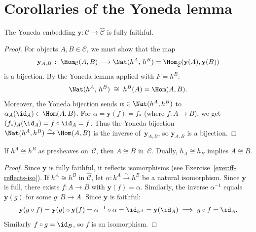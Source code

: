 \section{Corollaries of the Yoneda lemma}\label{sec:yoneda-corollaries}

\begin{corollary}%
\label{cor:yoneda-ff}
The Yoneda embedding $\mathbf{y}\colon\mathcal{C}\to\widehat{\mathcal{C}}$
is fully faithful.
\end{corollary}

\begin{proof}
For objects $A,B\in\mathcal{C}$, we must show that the map
\[
    \mathbf{y}_{A,B} \;\colon\;
    \Hom_{\mathcal{C}}(A,B) \longrightarrow
    \Nat(h^A,\,h^B) = \Hom_{\widehat{\mathcal{C}}}(\mathbf{y}(A),\mathbf{y}(B))
\]
is a bijection.  By the Yoneda lemma applied with $F = h^B$:
\[
    \Nat(h^A,\,h^B) \;\cong\; h^B(A) = \Hom(A,B).
\]
Moreover, the Yoneda bijection sends $\alpha\in\Nat(h^A,h^B)$ to
$\alpha_A(\id_A)\in\Hom(A,B)$.  For $\alpha = \mathbf{y}(f) = f_*$
(where $f\colon A\to B$), we get $(f_*)_A(\id_A) = f\circ\id_A = f$.
Thus the Yoneda bijection $\Nat(h^A,h^B)\xrightarrow{\sim}\Hom(A,B)$
is the inverse of~$\mathbf{y}_{A,B}$, so $\mathbf{y}_{A,B}$ is
a bijection.
\end{proof}

\begin{corollary}%
\label{cor:representable-iso}
If $h^A \cong h^B$ as presheaves on~$\mathcal{C}$, then $A\cong B$
in~$\mathcal{C}$.  Dually, $h_A\cong h_B$ implies $A\cong B$.
\end{corollary}

\begin{proof}
Since $\mathbf{y}$ is fully faithful, it reflects isomorphisms
(see Exercise~\ref{exer:ff-reflects-iso}).
If $h^A\cong h^B$ in $\widehat{\mathcal{C}}$, let
$\alpha\colon h^A\xrightarrow{\sim} h^B$ be a natural isomorphism.
Since $\mathbf{y}$ is full, there exists $f\colon A\to B$ with
$\mathbf{y}(f)=\alpha$.  Similarly, the inverse $\alpha^{-1}$ equals
$\mathbf{y}(g)$ for some $g\colon B\to A$.  Since $\mathbf{y}$ is faithful:
\[
    \mathbf{y}(g\circ f) = \mathbf{y}(g)\circ\mathbf{y}(f)
    = \alpha^{-1}\circ\alpha = \id_{h^A} = \mathbf{y}(\id_A)
    \implies g\circ f = \id_A.
\]
Similarly $f\circ g = \id_B$, so $f$ is an isomorphism.
\end{proof}

